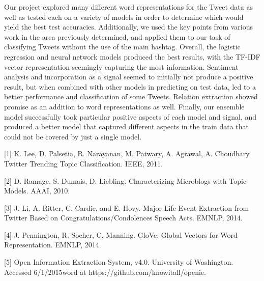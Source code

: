 \documentclass[11pt]{article}
\begin{document}
Our project explored many different word representations for the Tweet data as well as tested each on a variety of models in order to determine which would yield the best test accuracies. Additionally, we used the key points from various work in the area previously determined, and applied them to our task of classifying Tweets without the use of the main hashtag. Overall, the logistic regression and neural network models produced the best results, with the TF-IDF vector representation seemingly capturing the most information. Sentiment analysis and incorporation as a signal seemed to initially not produce a positive result, but when combined with other models in predicting on test data, led to a better performance and classification of some Tweets. Relation extraction showed promise as an addition to word representations as well. Finally, our ensemble model successfully took particular positive aspects of each model and signal, and produced a better model that captured different aspects in the train data that could not be covered by just a single model.

%
%

\begin{thebibliography}{1}

 [1] K. Lee, D. Palsetia, R. Narayanan, M. Patwary, A. Agrawal, A. Choudhary. Twitter Trending Topic Classification. IEEE, 2011.

 [2] D. Ramage, S. Dumais, D. Liebling. Characterizing Microblogs with Topic Models. AAAI, 2010.

 [3] J. Li, A. Ritter, C. Cardie, and E. Hovy. Major Life Event Extraction from Twitter Based on Congratulations/Condolences Speech Acts. EMNLP, 2014.

 [4] J. Pennington, R. Socher, C. Manning. GloVe: Global Vectors for Word Representation. EMNLP, 2014.

 [5] Open Information Extraction System, v4.0. University of Washington. Accessed 6/1/2015word  at https://github.com/knowitall/openie.

\end{thebibliography}
\end{document}
